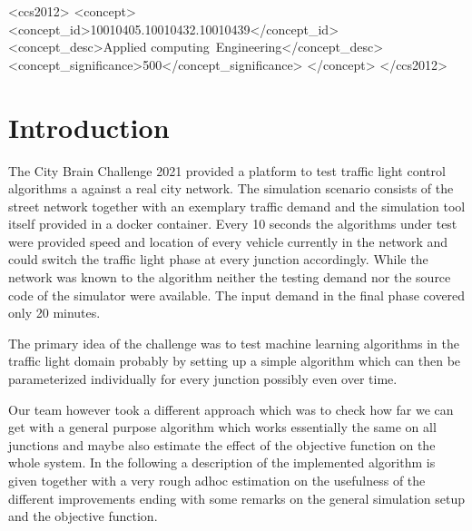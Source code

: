 \documentclass[sigconf,authordraft]{acmart}
\begin{document}
\begin{CCSXML}
<ccs2012>
<concept>
<concept_id>10010405.10010432.10010439</concept_id>
<concept_desc>Applied computing~Engineering</concept_desc>
<concept_significance>500</concept_significance>
</concept>
</ccs2012>
\end{CCSXML}



\maketitle

\section{Introduction}
The City Brain Challenge 2021 provided a platform to test traffic light control 
algorithms a against a real city network. The simulation scenario consists of 
the street network together with an exemplary traffic demand and the simulation tool itself
provided in a docker container. Every 10 seconds the algorithms under test were provided
speed and location of every vehicle currently in the network and could switch 
the traffic light phase at every junction accordingly. While the network was known to 
the algorithm neither the testing demand nor the source code of the simulator
were available. The input demand in the final phase covered only 20 minutes.

The primary idea of the challenge was to test machine learning algorithms in
the traffic light domain probably by setting up a simple algorithm which can then
be parameterized individually for every junction possibly even over time.

Our team however took a different approach which was to check how far we can get
with a general purpose algorithm which works essentially the same on all junctions
and maybe also estimate the effect of the objective function on the whole system.
In the following a description of the implemented algorithm is given together with 
a very rough adhoc estimation on the usefulness of the different improvements
ending with some remarks on the general simulation setup and the objective function.
\end{document}

